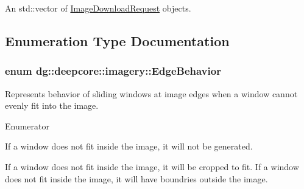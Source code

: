 An std\+::vector of \hyperlink{structdg_1_1deepcore_1_1imagery_1_1_image_download_request}{Image\+Download\+Request} objects. 



\subsection{Enumeration Type Documentation}
\subsubsection[{\texorpdfstring{Edge\+Behavior}{EdgeBehavior}}]{\setlength{\rightskip}{0pt plus 5cm}enum {\bf dg\+::deepcore\+::imagery\+::\+Edge\+Behavior}\hspace{0.3cm}{\ttfamily [strong]}}\hypertarget{group___imagery_module_gaf813556adc6cfc1daa1ee410d7c84a17}{}\label{group___imagery_module_gaf813556adc6cfc1daa1ee410d7c84a17}


Represents behavior of sliding windows at image edges when a window cannot evenly fit into the image. 

\begin{Desc}
\item[Enumerator]\par
\begin{description}
\item[{\em 
D\+R\+OP\hypertarget{group___imagery_module_gaf813556adc6cfc1daa1ee410d7c84a17abf8f3be424eb6a72b21549fbb24ffb57}{}\label{group___imagery_module_gaf813556adc6cfc1daa1ee410d7c84a17abf8f3be424eb6a72b21549fbb24ffb57}
}]\item[{\em 
C\+R\+OP\hypertarget{group___imagery_module_gaf813556adc6cfc1daa1ee410d7c84a17a611b0ab62590d6a92a429520f6a06363}{}\label{group___imagery_module_gaf813556adc6cfc1daa1ee410d7c84a17a611b0ab62590d6a92a429520f6a06363}
}]If a window does not fit inside the image, it will not be generated. \item[{\em 
F\+I\+LL\hypertarget{group___imagery_module_gaf813556adc6cfc1daa1ee410d7c84a17ae8225b11842409df543692aebed34fd1}{}\label{group___imagery_module_gaf813556adc6cfc1daa1ee410d7c84a17ae8225b11842409df543692aebed34fd1}
}]If a window does not fit inside the image, it will be cropped to fit. If a window does not fit inside the image, it will have boundries outside the image. \end{description}
\end{Desc}
